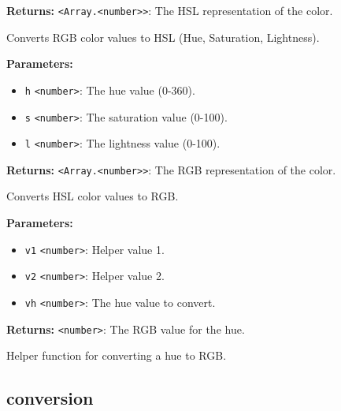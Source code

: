 \documentclass[12pt,a4paper]{article}
\begin{document}
\noindent \textbf{Returns:} \texttt{<Array.<number>>}: The HSL representation of the color.

\noindent Converts RGB color values to HSL (Hue, Saturation, Lightness).

\vspace{5mm}
\noindent {}


\noindent \textbf{Parameters:}
\begin{itemize}
  \item \texttt{h} \texttt{<number>}: The hue value (0-360).
  \item \texttt{s} \texttt{<number>}: The saturation value (0-100).
  \item \texttt{l} \texttt{<number>}: The lightness value (0-100).
\end{itemize}

\noindent \textbf{Returns:} \texttt{<Array.<number>>}: The RGB representation of the color.

\noindent Converts HSL color values to RGB.

\vspace{5mm}
\noindent {}


\noindent \textbf{Parameters:}
\begin{itemize}
  \item \texttt{v1} \texttt{<number>}: Helper value 1.
  \item \texttt{v2} \texttt{<number>}: Helper value 2.
  \item \texttt{vh} \texttt{<number>}: The hue value to convert.
\end{itemize}

\noindent \textbf{Returns:} \texttt{<number>}: The RGB value for the hue.

\noindent Helper function for converting a hue to RGB.


\subsection{conversion}
\vspace{5mm}
\noindent {}
\end{document}
